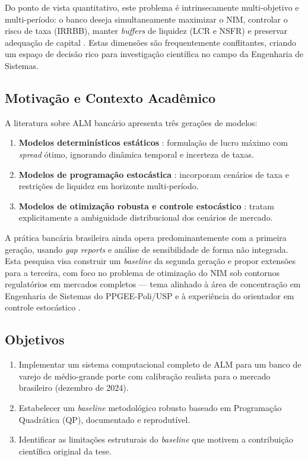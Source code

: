 \documentclass[12pt, a4paper, oneside]{article}
\begin{document}
Do ponto de vista quantitativo, este problema é intrinsecamente multi-objetivo
e multi-período: o banco deseja simultaneamente maximizar o NIM, controlar o
risco de taxa (IRRBB), manter \textit{buffers} de liquidez (LCR e NSFR) e
preservar adequação de capital \citep{BCBS368}. Estas dimensões são
frequentemente conflitantes, criando um espaço de decisão rico para
investigação científica no campo da Engenharia de Sistemas.

\subsection{Motivação e Contexto Acadêmico}

A literatura sobre ALM bancário apresenta três gerações de modelos:

\begin{enumerate}
  \item \textbf{Modelos determinísticos estáticos} \citep{Klein1971,Monti1972}:
    formulação de lucro máximo com \textit{spread} ótimo, ignorando dinâmica
    temporal e incerteza de taxas.
  \item \textbf{Modelos de programação estocástica}
    \citep{KusyZiemba1986,KouwenbergZenios2001}: incorporam cenários de taxa
    e restrições de liquidez em horizonte multi-período.
  \item \textbf{Modelos de otimização robusta e controle estocástico}
    \citep{BirgeLouveaux2011,Fabozzi2007}: tratam explicitamente a
    ambiguidade distribucional dos cenários de mercado.
\end{enumerate}

A prática bancária brasileira ainda opera predominantemente com a primeira
geração, usando \textit{gap reports} e análise de sensibilidade de forma
não integrada. Esta pesquisa visa construir um \textit{baseline} da segunda
geração e propor extensões para a terceira, com foco no problema de
otimização do NIM sob contornos regulatórios em mercados completos ---
tema alinhado à área de concentração em Engenharia de Sistemas do
PPGEE-Poli/USP e à experiência do orientador em controle estocástico
\citep{Costa2005}.

\subsection{Objetivos}

\begin{enumerate}
  \item Implementar um sistema computacional completo de ALM para um banco de
    varejo de médio-grande porte com calibração realista para o mercado
    brasileiro (dezembro de 2024).
  \item Estabelecer um \textit{baseline} metodológico robusto baseado em
    Programação Quadrática (QP), documentado e reprodutível.
  \item Identificar as limitações estruturais do \textit{baseline} que motivem
    a contribuição científica original da tese.
\end{enumerate}
\end{document}
